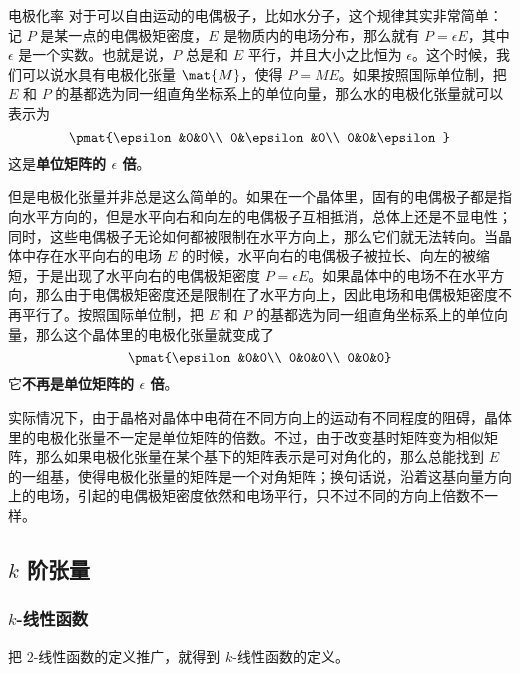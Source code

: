\begin{example}{电极化率}
对于可以自由运动的电偶极子，比如水分子，这个规律其实非常简单：记 ${P}$ 是某一点的电偶极矩密度，${E}$ 是物质内的电场分布，那么就有 ${P}=\epsilon{E}$，其中 $\epsilon$ 是一个实数。也就是说，${P}$ 总是和 ${E}$ 平行，并且大小之比恒为 $\epsilon$。这个时候，我们可以说水具有电极化张量 $\mat{M}$，使得 ${P}={M}{E}$。如果按照国际单位制，把 ${E}$ 和 ${P}$ 的基都选为同一组直角坐标系上的单位向量，那么水的电极化张量就可以表示为
\begin{equation}
\pmat{\epsilon&0&0\\ 0&\epsilon&0\\ 0&0&\epsilon}
\end{equation}
这是\textbf{单位矩阵的 $\epsilon$ 倍}。

但是电极化张量并非总是这么简单的。如果在一个晶体里，固有的电偶极子都是指向水平方向的，但是水平向右和向左的电偶极子互相抵消，总体上还是不显电性；同时，这些电偶极子无论如何都被限制在水平方向上，那么它们就无法转向。当晶体中存在水平向右的电场 ${E}$ 的时候，水平向右的电偶极子被拉长、向左的被缩短，于是出现了水平向右的电偶极矩密度 ${P}=\epsilon{E}$。如果晶体中的电场不在水平方向，那么由于电偶极矩密度还是限制在了水平方向上，因此电场和电偶极矩密度不再平行了。按照国际单位制，把 ${E}$ 和 ${P}$ 的基都选为同一组直角坐标系上的单位向量，那么这个晶体里的电极化张量就变成了
\begin{equation}
\pmat{\epsilon&0&0\\ 0&0&0\\ 0&0&0}
\end{equation}
它\textbf{不再是单位矩阵的 $\epsilon$ 倍}。

实际情况下，由于晶格对晶体中电荷在不同方向上的运动有不同程度的阻碍，晶体里的电极化张量不一定是单位矩阵的倍数。不过，由于改变基时矩阵变为相似矩阵，那么如果电极化张量在某个基下的矩阵表示是可对角化的，那么总能找到 ${E}$ 的一组基，使得电极化张量的矩阵是一个对角矩阵；换句话说，沿着这基向量方向上的电场，引起的电偶极矩密度依然和电场平行，只不过不同的方向上倍数不一样。

\end{example}


\subsection{$k$ 阶张量}

\subsubsection{$k$-线性函数}

把 $2$-线性函数的定义推广，就得到 $k$-线性函数的定义。


